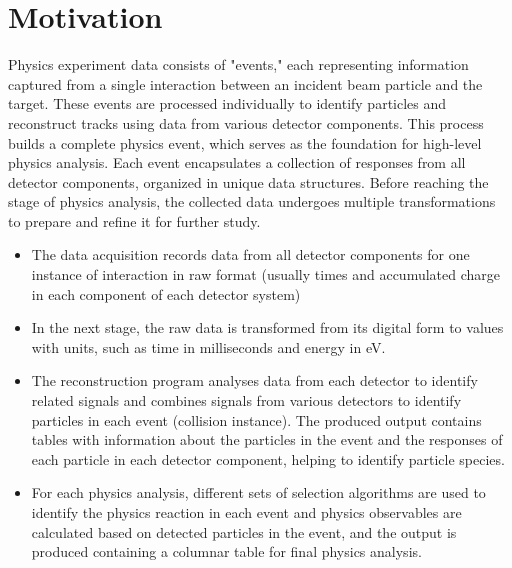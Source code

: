\section{Motivation}
\label{section-motivation}


Physics experiment data consists of "events," each representing information captured from a single interaction between an incident beam particle and the target. These events are processed individually to identify particles and reconstruct tracks using data from various detector components. This process builds a complete physics event, which serves as the foundation for high-level physics analysis. Each event encapsulates a collection of responses from all detector components, organized in unique data structures. Before reaching the stage of physics analysis, the collected data undergoes multiple transformations to prepare and refine it for further study.

\begin{itemize}
\item The data acquisition records data from all detector components for one instance of interaction in raw format  (usually times and accumulated charge in each component of each detector system) 
\item In the next stage, the raw data is transformed from its digital form to values with units, such as time in milliseconds and energy in eV.
\item The reconstruction program analyses data from each detector to identify related signals and combines signals from various detectors to identify particles in each event (collision instance). The produced output contains tables with information about the particles in the event and the responses of each particle in each detector component, helping to identify particle species.
\item For each physics analysis, different sets of selection algorithms are used to identify the physics reaction in each event and physics observables are calculated based on detected particles in the event, and the output is produced containing a columnar table for final physics analysis. 
\end{itemize}

